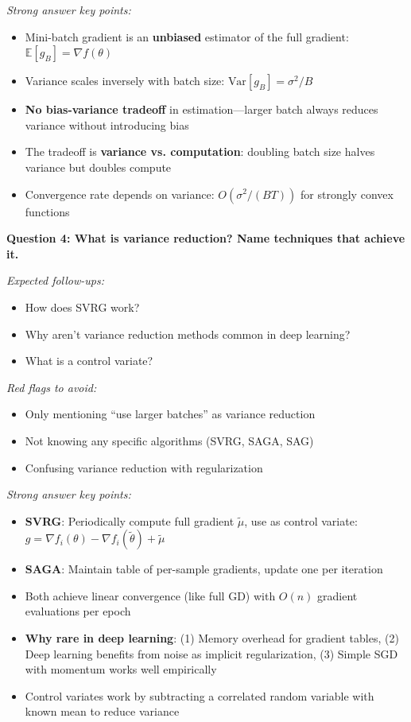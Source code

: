 \documentclass[../../main.tex]{subfiles}
\begin{document}
\begin{interviewquestions}
\textit{Strong answer key points:}
\begin{itemize}
    \item Mini-batch gradient is an \textbf{unbiased} estimator of the full gradient: $\mathbb{E}[g_B] = \nabla f(\theta)$
    \item Variance scales inversely with batch size: $\text{Var}[g_B] = \sigma^2/B$
    \item \textbf{No bias-variance tradeoff} in estimation---larger batch always reduces variance without introducing bias
    \item The tradeoff is \textbf{variance vs. computation}: doubling batch size halves variance but doubles compute
    \item Convergence rate depends on variance: $O(\sigma^2/(BT))$ for strongly convex functions
\end{itemize}

\vspace{0.5em}
\textbf{Question 4: What is variance reduction? Name techniques that achieve it.}

\textit{Expected follow-ups:}
\begin{itemize}
    \item How does SVRG work?
    \item Why aren't variance reduction methods common in deep learning?
    \item What is a control variate?
\end{itemize}

\textit{Red flags to avoid:}
\begin{itemize}
    \item Only mentioning ``use larger batches'' as variance reduction
    \item Not knowing any specific algorithms (SVRG, SAGA, SAG)
    \item Confusing variance reduction with regularization
\end{itemize}

\textit{Strong answer key points:}
\begin{itemize}
    \item \textbf{SVRG}: Periodically compute full gradient $\tilde{\mu}$, use as control variate: $g = \nabla f_i(\theta) - \nabla f_i(\tilde{\theta}) + \tilde{\mu}$
    \item \textbf{SAGA}: Maintain table of per-sample gradients, update one per iteration
    \item Both achieve linear convergence (like full GD) with $O(n)$ gradient evaluations per epoch
    \item \textbf{Why rare in deep learning}: (1) Memory overhead for gradient tables, (2) Deep learning benefits from noise as implicit regularization, (3) Simple SGD with momentum works well empirically
    \item Control variates work by subtracting a correlated random variable with known mean to reduce variance
\end{itemize}


\end{interviewquestions}
\end{document}
